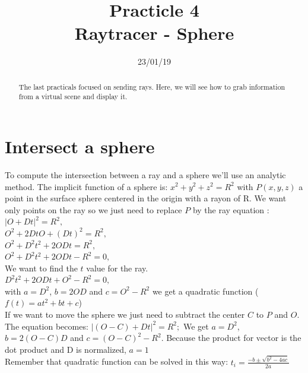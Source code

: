 \documentclass{article}
\begin{document}
\title{Practicle 4\\Raytracer - Sphere}
\date{23/01/19}
\maketitle

\begin{abstract}
	The last practicals focused on sending rays. Here, we will see how to grab information from a virtual scene and display it.
\end{abstract}

\section{Intersect a sphere}
To compute the intersection between a ray and a sphere we'll use an analytic method. The implicit function of a sphere is: $x^2+y^2+z^2 = R^2$ with $P(x, y, z)$ a point in the surface sphere centered in the origin with a rayon of R. We want only points on the ray so we just need to replace $P$ by the ray equation : \\
$|O+Dt|^2 = R^2,$\\
$O^2 + 2DtO + (Dt)^2 = R^2,$\\
$O^2 + D^2t^2 + 2ODt = R^2,$\\
$O^2 + D^2t^2 + 2ODt - R^2 = 0,$\\
We want to find the $t$ value for the ray.\\
$ D^2t^2 + 2ODt + O^2 - R^2 = 0,$\\
with $a = D^2$, $b = 2OD$ and $c = O^2 - R^2$ we get a quadratic function ($f(t) = at^2+bt+c$)\\
If we want to move the sphere we just need to subtract the center $C$ to $P$ and $O$. The equation becomes: $|(O-C)+Dt|^2 = R^2;$
We get $a = D^2$, $b = 2(O-C)D$ and $c = (O-C)^2 - R^2$. Because the product for vector is the dot product and D is normalized, $a=1$\\
Remember that quadratic function can be solved in this way: $t_i = \frac{-b\pm \sqrt{b^2-4ac}}{2a}$
\end{document}
